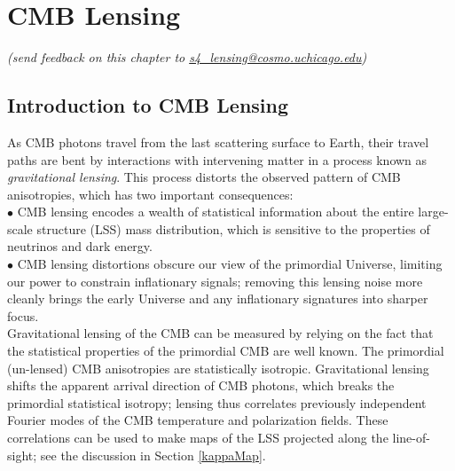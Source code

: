  
\chapter{CMB Lensing}

\begin{center}
{\small \it (send feedback on this chapter to \href{mailto:s4_lensing@cosmo.uchicago.edu}{s4\_lensing@cosmo.uchicago.edu})}
\end{center}



\def\nnu{N_{\mathrm eff}}
\def\gtrsim{\raise-.75ex\hbox{$\buildrel>\over\sim$}}
\section{Introduction to CMB Lensing}
\label{sec:lensing_intro}

As CMB photons travel from the last scattering surface to Earth, their travel paths are bent by interactions with intervening matter in a process known as \textit{gravitational lensing}.
This process distorts the observed pattern of CMB anisotropies, which has two important consequences:\\
 
$\bullet$ CMB lensing encodes a wealth of statistical information about the entire large-scale structure (LSS) mass distribution, which is sensitive to the properties of neutrinos and dark energy.\\

$\bullet$ CMB lensing distortions obscure our view of the primordial Universe, limiting our power to constrain inflationary signals; removing this lensing noise more cleanly brings the early Universe and any inflationary signatures into sharper focus.\\


Gravitational lensing of the CMB can be measured by relying on the fact that the statistical properties of the primordial CMB are well known.
The primordial (un-lensed) CMB anisotropies are statistically isotropic.
Gravitational lensing shifts the apparent arrival direction of CMB photons, which breaks the primordial statistical isotropy;
lensing thus correlates previously independent Fourier modes of the CMB temperature and polarization fields.
These correlations can be used to make maps of the LSS projected along the line-of-sight; see the discussion in Section \ref{kappaMap}.

